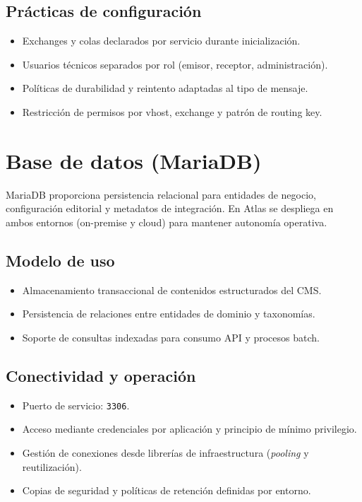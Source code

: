 \subsection*{Prácticas de configuración}

\begin{itemize}
\item Exchanges y colas declarados por servicio durante inicialización.
\item Usuarios técnicos separados por rol (emisor, receptor, administración).
\item Políticas de durabilidad y reintento adaptadas al tipo de mensaje.
\item Restricción de permisos por vhost, exchange y patrón de routing key.
\end{itemize}

\section{Base de datos (MariaDB)}

MariaDB proporciona persistencia relacional para entidades de negocio, configuración editorial y metadatos de integración. En Atlas se despliega en ambos entornos (on-premise y cloud) para mantener autonomía operativa.

\subsection*{Modelo de uso}

\begin{itemize}
\item Almacenamiento transaccional de contenidos estructurados del CMS.
\item Persistencia de relaciones entre entidades de dominio y taxonomías.
\item Soporte de consultas indexadas para consumo API y procesos batch.
\end{itemize}

\subsection*{Conectividad y operación}

\begin{itemize}
\item Puerto de servicio: \texttt{3306}.
\item Acceso mediante credenciales por aplicación y principio de mínimo privilegio.
\item Gestión de conexiones desde librerías de infraestructura (\textit{pooling} y reutilización).
\item Copias de seguridad y políticas de retención definidas por entorno.
\end{itemize}

